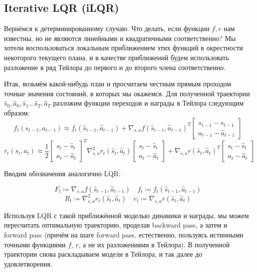 \subsection{Iterative LQR (iLQR)}

Вернёмся к детерминированному случаю. Что делать, если функции $f, r$ нам известны, но не являются линейными и квадратичными соответственно? Мы хотели воспользоваться локальным приближением этих функций в окрестности некоторого текущего плана, и в качестве приближений будем использовать разложение в ряд Тейлора до первого и до второго члена соответственно.

Итак, возьмём какой-нибудь план и просчитаем честным прямым проходом точные значения состояний, в которых мы окажемся. Для полученной траектории $\hat{s}_0, \hat{a}_0, \hat{s}_1 \dots \hat{s}_T, \hat{a}_T$ разложим функции переходов и награды в Тейлора следующим образом:
$$f_t(s_{t-1}, a_{t-1}) \approx f_t(\hat{s}_{t-1}, \hat{a}_{t-1}) + \nabla_{s, a} f(\hat{s}_{t-1}, \hat{a}_{t-1})^T \begin{bmatrix} s_{t-1} - \hat{s}_{t-1} \\ a_{t-1} - \hat{a}_{t-1} \end{bmatrix}$$
$$r_t(s_t, a_t) \approx \frac{1}{2}\begin{bmatrix} s_t - \hat{s}_t \\ a_t - \hat{a}_t \end{bmatrix}^T \nabla^2_{s, a} r_t(\hat{s}_{t}, \hat{a}_{t})\begin{bmatrix} s_t - \hat{s}_t \\ a_t - \hat{a}_t \end{bmatrix} + \nabla_{s, a} r(\hat{s}_t, \hat{a}_t)^T \begin{bmatrix} s_t - \hat{s}_t \\ a_t - \hat{a}_t \end{bmatrix}$$

Вводим обозначения аналогично LQR:

\begin{equation}\label{TaylorFforLQR}
F_t \coloneqq \nabla_{s, a} f(\hat{s}_{t-1}, \hat{a}_{t-1}) \quad f_t \coloneqq f_t(\hat{s}_{t-1}, \hat{a}_{t-1})
\end{equation}
\begin{equation}\label{TaylorRforLQR}
R_t \coloneqq \nabla^2_{s, a} r_t(\hat{s}_{t}, \hat{a}_{t}) \quad r_t \coloneqq \nabla_{s, a} r(\hat{s}_t, \hat{a}_t)
\end{equation}

Используя LQR с такой приближённой моделью динамики и награды, мы можем пересчитать оптимальную траекторию, проделав backward pass, а затем и forward pass (причём на шаге forward pass, естественно, пользуясь истинными точными функциями $f$, $r$, а не их разложениями в Тейлора). В полученной траектории снова раскладываем модели в Тейлора, и так далее до удовлетворения.

